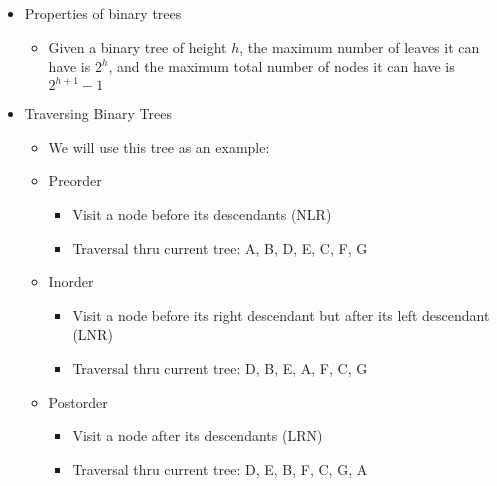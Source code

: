 \documentclass{article}
\begin{document}
\begin{itemize}
\begin{itemize}
            \item Properties of binary trees
                \begin{itemize}
                    \item Given a binary tree of height $h$, the maximum number of leaves it can have is $2^h$, and the maximum total number of nodes it can have is $2^{h + 1} - 1$
                \end{itemize}
            \item Traversing Binary Trees
                \begin{itemize}
                    \item We will use this tree as an example:

                    \item Preorder
                        \begin{itemize}
                            \item Visit a node before its descendants (NLR)
                            \item Traversal thru current tree: A, B, D, E, C, F, G
                        \end{itemize}
                    \item Inorder
                        \begin{itemize}
                            \item Visit a node before its right descendant but after its left descendant (LNR)
                            \item Traversal thru current tree: D, B, E, A, F, C, G
                        \end{itemize}
                    \item Postorder
                        \begin{itemize}
                            \item Visit a node after its descendants (LRN)
                            \item Traversal thru current tree: D, E, B, F, C, G, A

\end{itemize}
\end{itemize}
\end{itemize}
\end{itemize}
\end{document}
